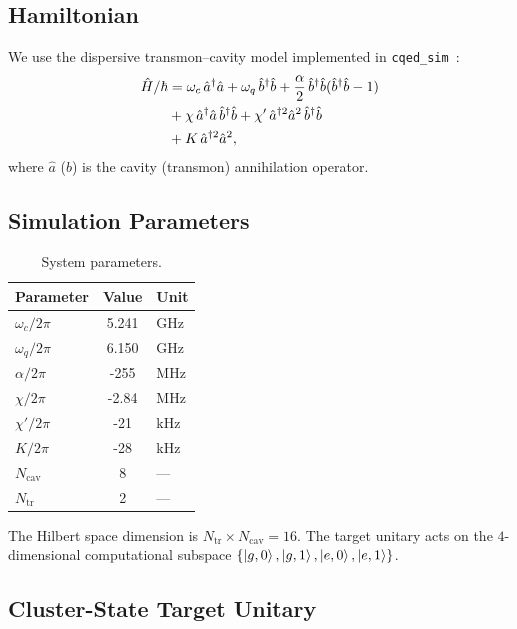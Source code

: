 \documentclass[aps,pra,twocolumn,reprint,floatfix,amsmath,amssymb]{revtex4-2}
\begin{document}
\subsection{Hamiltonian}

We use the dispersive transmon--cavity model implemented in
\texttt{cqed\_sim}~\cite{cqed_sim}:
\begin{align}
  \hat{H}/\hbar &= \omega_c\,\hat{a}^\dagger\hat{a}
    + \omega_q\,\hat{b}^\dagger\hat{b}
    + \frac{\alpha}{2}\,\hat{b}^\dagger\hat{b}(\hat{b}^\dagger\hat{b}-1)
    \notag\\
    &+ \chi\,\hat{a}^\dagger\hat{a}\,\hat{b}^\dagger\hat{b}
    + \chi'\,\hat{a}^{\dagger2}\hat{a}^2\,\hat{b}^\dagger\hat{b}
    \notag\\
    &+ K\,\hat{a}^{\dagger2}\hat{a}^2,
  \label{eq:H}
\end{align}
where $\hat{a}$ ($\hat{b}$) is the cavity (transmon) annihilation
operator.

\subsection{Simulation Parameters}

\begin{table}[h]
  \centering
  \caption{System parameters.}\label{tab:params}
  \begin{tabular}{@{} l S[table-format=+4.3] l @{}}
    \toprule
    Parameter & {Value} & Unit \\
    \midrule
    $\omega_c/2\pi$ & 5.241 & GHz \\
    $\omega_q/2\pi$ & 6.150 & GHz \\
    $\alpha/2\pi$   & -255  & MHz \\
    $\chi/2\pi$     & -2.84 & MHz \\
    $\chi'/2\pi$    & -21   & kHz \\
    $K/2\pi$        & -28   & kHz \\
    $N_\mathrm{cav}$ & 8    & --- \\
    $N_\mathrm{tr}$  & 2    & --- \\
    \bottomrule
  \end{tabular}
\end{table}

The Hilbert space dimension is
$N_\mathrm{tr}\times N_\mathrm{cav}=16$.  The target unitary acts
on the $4$-dimensional computational subspace
$\{\ket{g,0},\ket{g,1},\ket{e,0},\ket{e,1}\}$.

\subsection{Cluster-State Target Unitary}
\end{document}
